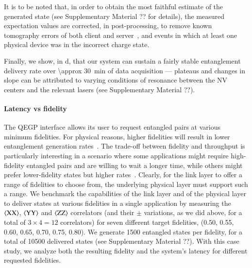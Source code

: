 It is to be noted that, in order to obtain the most faithful estimate of the generated state (see
Supplementary Material ?? for details), the measured expectation values are corrected, in
post-processing, to remove known tomography errors of both client and
server~\cite{nachman_2020_unfolding}, and events in which at least one physical device was in the
incorrect charge state.

Finally, we show, in d, that our system can sustain a fairly stable
entanglement delivery rate over \qty{\approx 30}{min} of data acquisition --- plateaus and changes
in slope can be attributed to varying conditions of resonance between the NV centers and the
relevant lasers (see Supplementary Material ??).

\paragraph{Latency vs fidelity}

The QEGP interface allows its user to request entangled pairs at various minimum fidelities. For
physical reasons, higher fidelities will result in lower entanglement generation
rates~\cite{stockill_2017_phasetuned, humphreys_2018_delivery}. The trade-off between fidelity and
throughput is particularly interesting in a scenario where some applications might require
high-fidelity entangled pairs and are willing to wait a longer time, while others might prefer
lower-fidelity states but higher rates~\cite{dahlberg_2019_egp}. Clearly, for the link layer to
offer a range of fidelities to choose from, the underlying physical layer must support such a range.
We benchmark the capabilities of the link layer and of the physical layer to deliver states at
various fidelities in a single application by measuring the $\braket{\mathrm{XX}}$,
$\braket{\mathrm{YY}}$ and $\braket{\mathrm{ZZ}}$ correlators (and their $\pm$ variations, as we did
above, for a total of $3 \times 4 = 12$ correlators) for seven different target fidelities,
(\num{0.50}, \num{0.55}, \num{0.60}, \num{0.65}, \num{0.70}, \num{0.75}, \num{0.80}). We generate
\num{1500} entangled states per fidelity, for a total of \num{10500} delivered states (see
Supplementary Material ??). With this case study, we analyze both the resulting fidelity and the
system's latency for different requested fidelities.

